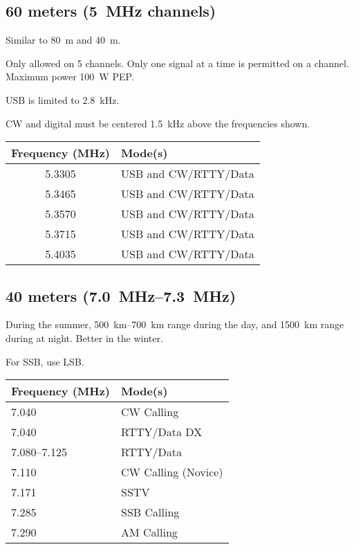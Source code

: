 \documentclass[11pt, twocolumn]{article}
\begin{document}
\subsection{60 meters (\SI{5}{\MHz} channels)}
Similar to \SI{80}{\m} and \SI{40}{m}. 

Only allowed on 5 channels. Only one signal at a time is permitted
on a channel. Maximum power \SI{100}{\W} PEP.

USB is limited to \SI{2.8}{\kHz}.

CW and digital must be centered \SI{1.5}{\kHz} above the frequencies shown.

\begin{center}
  \begin{tabular}{S l}
    {Frequency (\si{\MHz})}	&	Mode(s)					\\
    \midrule
    \num{5.3305}			&	USB and CW/RTTY/Data	\\
    \num{5.3465}			&	USB and CW/RTTY/Data	\\
    \num{5.3570}			&	USB and CW/RTTY/Data	\\
    \num{5.3715}			&	USB and CW/RTTY/Data	\\
    \num{5.4035}			&	USB and CW/RTTY/Data	\\
  \end{tabular}
\end{center}


\subsection{40 meters (\SIrange{7.0}{7.3}{\MHz})}
During the summer, \SIrange{500}{700}{\km} range during the day,
and \SI{1500}{\km} range during at night. Better in the winter.

For SSB, use LSB.
\begin{center}
  \begin{tabular}{l l}
    {Frequency (\si{\MHz})}	&	Mode(s)					\\
    \midrule
    \num{7.040}				&	CW Calling				\\
    \num{7.040}				&	RTTY/Data DX			\\
    \numrange{7.080}{7.125}	&	RTTY/Data				\\
    \num{7.110}				&	CW Calling (Novice)		\\
    \num{7.171}				&	SSTV					\\
    \num{7.285}				&	SSB Calling				\\
    \num{7.290}				&	AM Calling				\\
  \end{tabular}
\end{center}
\end{document}
